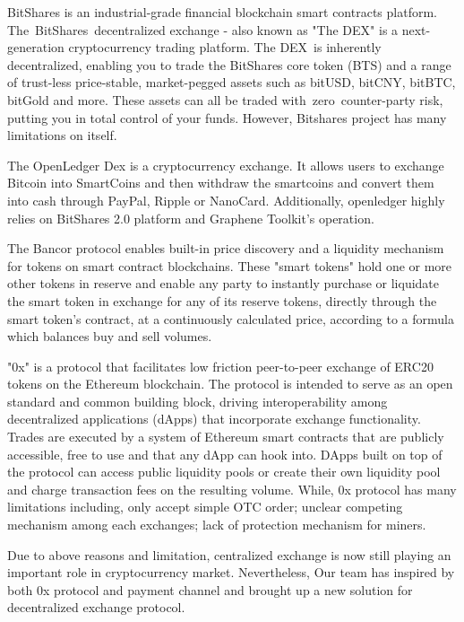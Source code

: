 \documentclass[UTF8,nofonts]{article}
\begin{document}
BitShares\cite{schuhbitshares}\cite{schuh2015bitshares} is an industrial-grade financial blockchain smart contracts platform. The BitShares decentralized exchange - also known as "The DEX" is a next-generation cryptocurrency trading platform. The DEX is inherently decentralized,  enabling you to trade the BitShares core token (BTS) and a range of trust-less price-stable,  market-pegged assets such as bitUSD,  bitCNY,  bitBTC,  bitGold and more. These assets can all be traded with zero counter-party risk,  putting you in total control of your funds. However,  Bitshares project has many limitations on itself.

The OpenLedger Dex\cite{openledger} is a cryptocurrency exchange. It allows users to exchange Bitcoin into SmartCoins and then withdraw the smartcoins and convert them into cash through PayPal,  Ripple or NanoCard. Additionally,  openledger highly relies on BitShares 2.0 platform and Graphene Toolkit's operation.

The Bancor\cite{bancor}\cite{hanson2012logarithmic} protocol enables built-in price discovery and a liquidity mechanism for tokens on smart contract blockchains. These "smart tokens" hold one or more other tokens in reserve and enable any party to instantly purchase or liquidate the smart token in exchange for any of its reserve tokens,  directly through the smart token's contract,  at a continuously calculated price, according to a formula which balances buy and sell volumes.

"0x"\cite{warren20170x} is a protocol that facilitates low friction peer-to-peer exchange of ERC20\cite{ERC20} tokens on the Ethereum blockchain. The protocol is intended to serve as an open standard and common building block,  driving interoperability among decentralized applications (dApps) that incorporate exchange functionality. Trades are executed by a system of Ethereum smart contracts that are publicly accessible,  free to use and that any dApp can hook into. DApps built on top of the protocol can access public liquidity pools or create their own liquidity pool and charge transaction fees on the resulting volume. While,  0x protocol has many limitations including,  only accept simple OTC order; unclear competing mechanism among each exchanges; lack of protection mechanism for miners.

Due to above reasons and limitation,  centralized exchange is now still playing an important role in cryptocurrency market. Nevertheless,  Our team has inspired by both 0x protocol and payment channel and brought up a new solution for decentralized exchange protocol.
\end{document}
